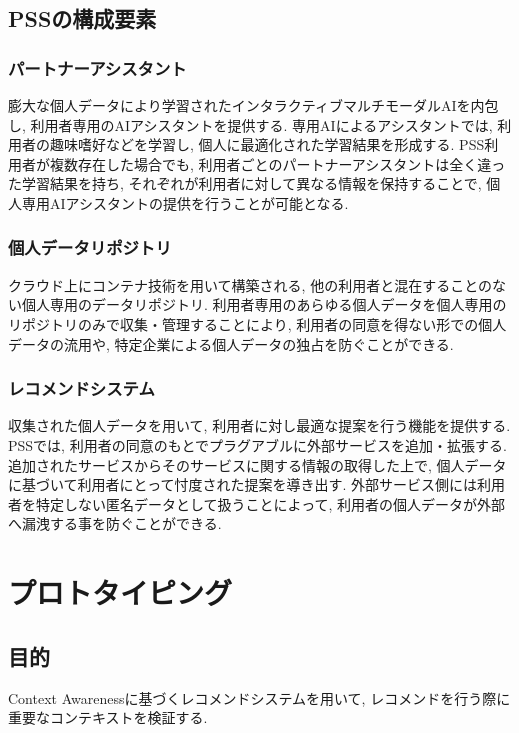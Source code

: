 \documentclass[a4j,twocolumn]{jsarticle}
\begin{document}
\subsection{PSSの構成要素}
\subsubsection{パートナーアシスタント}
膨大な個人データにより学習されたインタラクティブマルチモーダルAIを内包し, 利用者専用のAIアシスタントを提供する.
専用AIによるアシスタントでは, 利用者の趣味嗜好などを学習し, 個人に最適化された学習結果を形成する.
PSS利用者が複数存在した場合でも, 利用者ごとのパートナーアシスタントは全く違った学習結果を持ち, それぞれが利用者に対して異なる情報を保持することで, 個人専用AIアシスタントの提供を行うことが可能となる.

\subsubsection{個人データリポジトリ}
クラウド上にコンテナ技術を用いて構築される, 他の利用者と混在することのない個人専用のデータリポジトリ.
利用者専用のあらゆる個人データを個人専用のリポジトリのみで収集・管理することにより, 利用者の同意を得ない形での個人データの流用や, 特定企業による個人データの独占を防ぐことができる.

\subsubsection{レコメンドシステム}
収集された個人データを用いて, 利用者に対し最適な提案を行う機能を提供する.
PSSでは, 利用者の同意のもとでプラグアブルに外部サービスを追加・拡張する. 
追加されたサービスからそのサービスに関する情報の取得した上で, 個人データに基づいて利用者にとって忖度された提案を導き出す.
外部サービス側には利用者を特定しない匿名データとして扱うことによって, 利用者の個人データが外部へ漏洩する事を防ぐことができる.


\section{プロトタイピング}
\subsection{目的}
Context Awarenessに基づくレコメンドシステムを用いて, レコメンドを行う際に重要なコンテキストを検証する.
\end{document}
